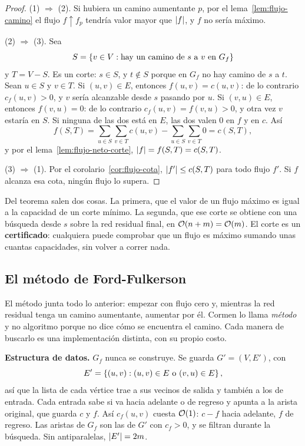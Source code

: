 \documentclass[11pt,letterpaper]{article}
\begin{document}
\begin{proof}
  (1) $\Rightarrow$ (2). Si hubiera un camino aumentante $p$, por el
  lema~\ref{lem:flujo-camino} el flujo $f \uparrow f_p$ tendría valor
  mayor que $\left\lvert f \right\rvert$, y $f$ no sería máximo.

  (2) $\Rightarrow$ (3). Sea
  \[
    S = \left\{ v \in V : \text{hay un camino de } s \text{ a } v
             \text{ en } G_f \right\}
  \]
  y $T = V - S$. Es un corte: $s \in S$, y $t \notin S$ porque en
  $G_f$ no hay camino de $s$ a $t$. Sean $u \in S$ y $v \in T$. Si
  $(u, v) \in E$, entonces $f(u, v) = c(u, v)$: de lo contrario
  $c_f(u, v) > 0$, y $v$ sería alcanzable desde $s$ pasando por $u$.
  Si $(v, u) \in E$, entonces $f(v, u) = 0$: de lo contrario
  $c_f(u, v) = f(v, u) > 0$, y otra vez $v$ estaría en $S$. Si ninguna
  de las dos está en $E$, las dos valen $0$ en $f$ y en $c$. Así
  \[
    f(S, T) = \sum_{u \in S} \sum_{v \in T} c(u, v)
            - \sum_{u \in S} \sum_{v \in T} 0 = c(S, T) ,
  \]
  y por el lema~\ref{lem:flujo-neto-corte}, $\left\lvert f \right\rvert = f(S, T) =
  c(S, T)$.

  (3) $\Rightarrow$ (1). Por el corolario~\ref{cor:flujo-cota},
  $\left\lvert f' \right\rvert \le c(S, T)$ para todo flujo $f'$. Si $f$ alcanza esa
  cota, ningún flujo lo supera.
\end{proof}

Del teorema salen dos cosas. La primera, que el valor de un flujo
máximo es igual a la capacidad de un corte mínimo. La segunda, que ese
corte se obtiene con una búsqueda desde $s$ sobre la red residual
final, en $\mathcal{O}\!\left(n + m\right) = \mathcal{O}\!\left(m\right)$. El corte es un
\textbf{certificado}: cualquiera puede comprobar que un flujo es
máximo sumando unas cuantas capacidades, sin volver a correr nada.


\subsection*{El método de Ford-Fulkerson}

El método junta todo lo anterior: empezar con flujo cero y, mientras
la red residual tenga un camino aumentante, aumentar por él. Cormen lo
llama \emph{método} y no algoritmo porque no dice cómo se encuentra el
camino. Cada manera de buscarlo es una implementación distinta, con su
propio costo.

\textbf{Estructura de datos.} $G_f$ nunca se construye. Se guarda
$G' = (V, E')$, con
\[
  E' = \left\{ (u, v) : (u, v) \in E \text{ o } (v, u) \in E \right\} ,
\]
así que la lista de cada vértice trae a sus vecinos de salida y
también a los de entrada. Cada entrada sabe si va hacia adelante o
de regreso y apunta a la arista original, que guarda $c$ y $f$. Así
$c_f(u, v)$ cuesta $\mathcal{O}\!\left(1\right)$: $c - f$ hacia adelante, $f$ de regreso.
Las aristas de $G_f$ son las de $G'$ con $c_f > 0$, y se filtran
durante la búsqueda. Sin antiparalelas, $\left\lvert E' \right\rvert = 2m$.
\end{document}

